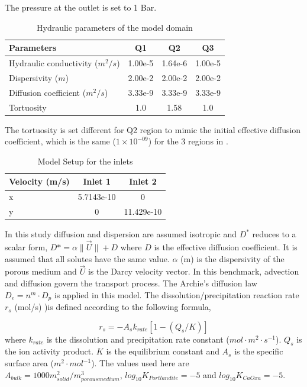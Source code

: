 The pressure at the outlet is set to 1 Bar.
\begin{table}[h]
\caption{Hydraulic parameters of the model domain}
\begin{center}
\begin{tabular}{lccc}
\hline
Parameters                       & Q1      & Q2      &  Q3      \\
\hline
Hydraulic conductivity ($m^2/s$) & 1.00e-5 & 1.64e-6 &  1.00e-5 \\
Dispersivity ($m$)               & 2.00e-2 & 2.00e-2 &  2.00e-2 \\
Diffusion coefficient ($m^2/s $) & 3.33e-9 & 3.33e-9 &  3.33e-9 \\
Tortuosity                       & 1.0     & 1.58    &  1.0     \\
\hline
\end{tabular}
\label{tab:comedy_H_par}
\end{center}
\end{table}

The tortuosity is set different for Q2 region to mimic the initial effective diffusion coefficient, which is the same ($1\times 10^{-09}$) for the 3 regions in \cite{Cochepin2008}. 
\begin{table}[h]
\caption{Model Setup for the inlets}
\begin{tabular}{l|c|c}
\hline
Velocity (m/s)  & Inlet 1    & Inlet 2    \\
\hline
x               & 5.7143e-10 & 0          \\
y               & 0          & 11.429e-10 \\
\hline
\end{tabular}
\label{tab:comedy_inlet}
\end{table}
In this study diffusion and dispersion are assumed isotropic and $D^*$ reduces to a scalar form, $D* = \alpha \| \overrightarrow{U} \| + D$ where $D$ is the effective diffusion coefficient. It is assumed that all solutes have the same value. $\alpha$ (m) is the dispersivity of the porous medium and $\overrightarrow{U}$ is the Darcy velocity vector. In this benchmark, advection and diffusion govern the transport process. The Archie's diffusion law $D_e = n^m \cdot D_p$ is applied in this model. The dissolution/precipitation reaction rate $r_s$ (mol/s) )is defined according to the following formula, 

\begin{equation}
r_s = - A_s k_{rate}[ 1 - (Q_s / K) ]
\end{equation}
where $k_{rate}$ is the dissolution and precipitation rate constant ($mol \cdot m^2 \cdot s^{-1}$). $Q_s$ is the ion activity product. $K$ is the equilibrium constant and $A_s$ is the specific surface area ($m^2 \cdot mol^{-1}$). The values used here are $A_{bulk} = 1000 m^2_{solid} / m^3_{porous medium}$, $log_{10}K_{Portlandite} = -5$ and $log_{10}K_{CaOxa} = -5$. 

